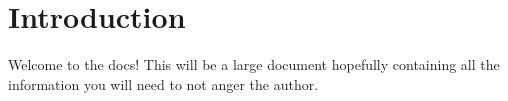 \documentclass[a4paper,twocolumn,11pt]{article}
\begin{document}
    
    
    \tableofcontents

    \section{Introduction}
    Welcome to the \luma{} docs!
    This will be a large document hopefully containing all the information you will need to not anger the author.



    
    
\end{document}
